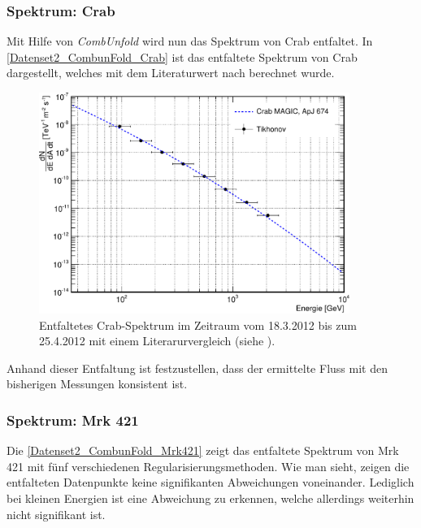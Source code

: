 \subsubsection{Spektrum: Crab}
Mit Hilfe von \textit{CombUnfold} wird nun das Spektrum von Crab entfaltet.
In \autoref{Datenset2_CombunFold_Crab} ist das entfaltete Spektrum von Crab dargestellt, welches mit dem Literaturwert nach \cite{LiteraturreferenzMAGIC} berechnet wurde.

\begin{figure}
    \centering
    \includegraphics[width=0.9\textwidth]{./Plots/04_MrkAnalyse/Datenset2/Crab_mit_Literatur.pdf}
    \caption{Entfaltetes Crab-Spektrum im Zeitraum vom 18.3.2012 bis zum 25.4.2012 mit einem Literarurvergleich (siehe \cite{LiteraturreferenzMAGIC}).}
    \label{Datenset2_CombunFold_Crab}
\end{figure}

Anhand dieser Entfaltung ist festzustellen, dass der ermittelte Fluss mit den bisherigen Messungen konsistent ist.

\subsubsection{Spektrum: Mrk 421}
Die \autoref{Datenset2_CombunFold_Mrk421} zeigt das entfaltete Spektrum von Mrk 421 mit fünf verschiedenen Regularisierungsmethoden.
Wie man sieht, zeigen die entfalteten Datenpunkte keine signifikanten Abweichungen voneinander. 
Lediglich bei kleinen Energien ist eine Abweichung zu erkennen, welche allerdings weiterhin nicht signifikant ist.

